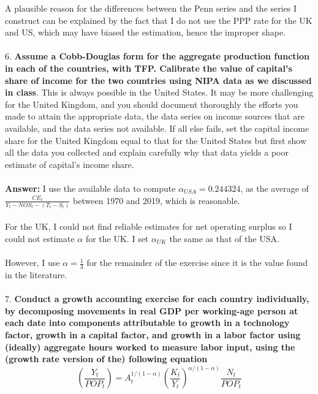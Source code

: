 \documentclass[12pt]{article}
\theoremstyle{mytheoremstyle}
\theoremstyle{mytheoremstyle}
\theoremstyle{myproblemstyle}
\begin{document}
A plausible reason for the differences between the Penn series and the series I construct can be explained by the fact that I do not use the PPP rate for the UK and US, which may have biased the estimation, hence the improper shape. 
\\ \\ 
6. \textbf{Assume a Cobb-Douglas form for the aggregate production function in each of the countries, with TFP. Calibrate the value of capital’s share of income for the two countries using NIPA data as we discussed in class}. This is always possible in the United States. It may be more challenging for the United Kingdom, and you should document thoroughly the efforts you made to attain the appropriate data, the data series on income sources that are available, and the data series not available. If all else fails, set the capital income share for the United Kingdom equal to that for the United States but first show all the data you collected and explain carefully why that data yields a poor estimate of capital’s income share.
\\ \\ 
\textbf{Answer:} I use the available data to compute $\alpha_{USA} = 0.244324$, as the average of $\frac{CE_t}{Y_t-NOS_t-(T_t - S_t)}$ between 1970 and 2019, which is reasonable. 
\\ \\ 
For the UK, I could not find reliable estimates for net operating surplus so I could not estimate $\alpha$ for the UK. I set $\alpha_{UK}$ the same as that of the USA.
\\ \\ 
However, I use $\alpha = \frac{1}{3}$ for the remainder of the exercise since it is the value found in the literature.
\\ \\ 
7. \textbf{Conduct a growth accounting exercise for each country individually, by decomposing movements in real GDP per working-age person at each date into components attributable to growth in a technology factor, growth in a capital factor, and growth in a labor factor using (ideally) aggregate hours worked to measure labor input, using the (growth rate version of the) following equation}
$$
\left(\frac{Y_t}{P O P_t}\right)=A_t^{1 /(1-\alpha)}\left(\frac{K_t}{Y_t}\right)^{\alpha /(1-\alpha)} \frac{N_t}{P O P_t}
$$
\end{document}
